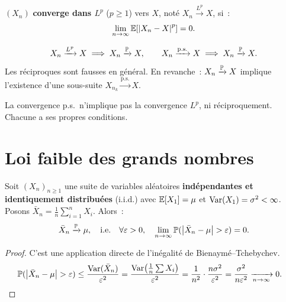\begin{definition}
$(X_n)$ \textbf{converge dans $L^p$} ($p \geq 1$) vers $X$, not\'e
$X_n \xrightarrow{L^p} X$, si~:
\[
    \lim_{n \to \infty} \mathbb{E}[\left| X_n - X \right|^p] = 0.
\]
\end{definition}

\begin{theoreme}
\[
    X_n \xrightarrow{L^p} X \implies X_n \xrightarrow{\mathbb{P}} X,
    \qquad
    X_n \xrightarrow{\text{p.s.}} X \implies X_n \xrightarrow{\mathbb{P}} X.
\]
Les r\'eciproques sont fausses en g\'en\'eral. En revanche~:
$X_n \xrightarrow{\mathbb{P}} X$ implique l'existence d'une sous-suite
$X_{n_k} \xrightarrow{\text{p.s.}} X$.
\end{theoreme}

\begin{attention}[title=\textbf{Convergence p.s.\ et convergence $L^p$}]
La convergence p.s.\ n'implique pas la convergence $L^p$, ni r\'eciproquement.
Chacune a ses propres conditions.
\end{attention}

\section{Loi faible des grands nombres}

\begin{theoreme}
\label{thm:lfgn}
Soit $(X_n)_{n \geq 1}$ une suite de variables al\'eatoires
\textbf{ind\'ependantes et identiquement distribu\'ees} (i.i.d.) avec
$\mathbb{E}[X_1] = \mu$ et $\mathrm{Var}(X_1) = \sigma^2 < \infty$. Posons
$\bar{X}_n = \frac{1}{n}\sum_{i=1}^n X_i$. Alors~:
\[
    \bar{X}_n \xrightarrow{\mathbb{P}} \mu, \quad
    \text{i.e.} \quad \forall \varepsilon > 0, \quad
    \lim_{n \to \infty} \mathbb{P}(\left| \bar{X}_n - \mu \right| > \varepsilon) = 0.
\]
\end{theoreme}

\begin{proof}
C'est une application directe de l'in\'egalit\'e de Bienaym\'e--Tchebychev.
\begin{align*}
    \mathbb{P}(\left| \bar{X}_n - \mu \right| > \varepsilon)
    &\leq \frac{\mathrm{Var}(\bar{X}_n)}{\varepsilon^2}
    = \frac{\mathrm{Var}\!\left(\frac{1}{n}\sum X_i\right)}{\varepsilon^2}
    = \frac{1}{n^2} \cdot \frac{n\sigma^2}{\varepsilon^2}
    = \frac{\sigma^2}{n\varepsilon^2}
    \xrightarrow[n \to \infty]{} 0. \qedhere
\end{align*}
\end{proof}

